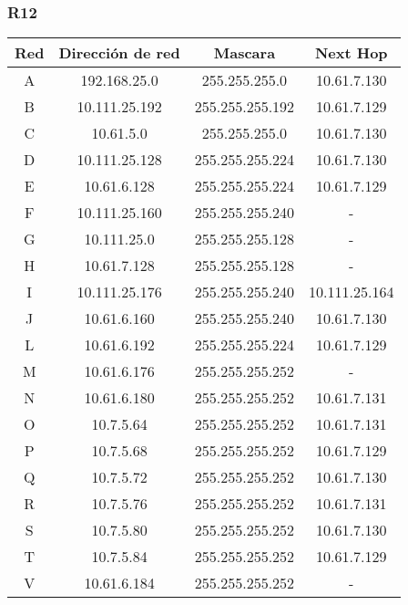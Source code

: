 \subsubsection{R12}
\begin{table}[!htbp]
\centering
  \begin{tabular}{|c|c|c|c|}
  \hline
Red & Dirección de red & Mascara & Next Hop\\ \hline
A & 192.168.25.0 & 255.255.255.0 & 10.61.7.130 \\ \hline
B & 10.111.25.192 & 255.255.255.192 & 10.61.7.129 \\ \hline
C & 10.61.5.0 & 255.255.255.0 & 10.61.7.130 \\ \hline
D & 10.111.25.128 & 255.255.255.224 & 10.61.7.130 \\ \hline
E & 10.61.6.128 & 255.255.255.224 & 10.61.7.129 \\ \hline
F & 10.111.25.160 & 255.255.255.240 & -\\ \hline
G & 10.111.25.0 & 255.255.255.128 & -\\ \hline
H & 10.61.7.128 & 255.255.255.128 & -\\ \hline
I & 10.111.25.176 & 255.255.255.240 &10.111.25.164 \\ \hline
J & 10.61.6.160 & 255.255.255.240 &10.61.7.130 \\ \hline
L & 10.61.6.192 & 255.255.255.224 &10.61.7.129 \\ \hline
M & 10.61.6.176 & 255.255.255.252 & -\\ \hline
N & 10.61.6.180 & 255.255.255.252 &10.61.7.131 \\ \hline
O & 10.7.5.64 & 255.255.255.252 & 10.61.7.131 \\ \hline
P & 10.7.5.68 & 255.255.255.252 & 10.61.7.129\\ \hline
Q & 10.7.5.72 & 255.255.255.252 & 10.61.7.130 \\ \hline
R & 10.7.5.76 & 255.255.255.252 & 10.61.7.131 \\ \hline
S & 10.7.5.80 & 255.255.255.252 & 10.61.7.130 \\ \hline
T & 10.7.5.84 & 255.255.255.252 &10.61.7.129 \\ \hline
V & 10.61.6.184 & 255.255.255.252 & -\\
  \hline
 \end{tabular}
\end{table}

\newpage
